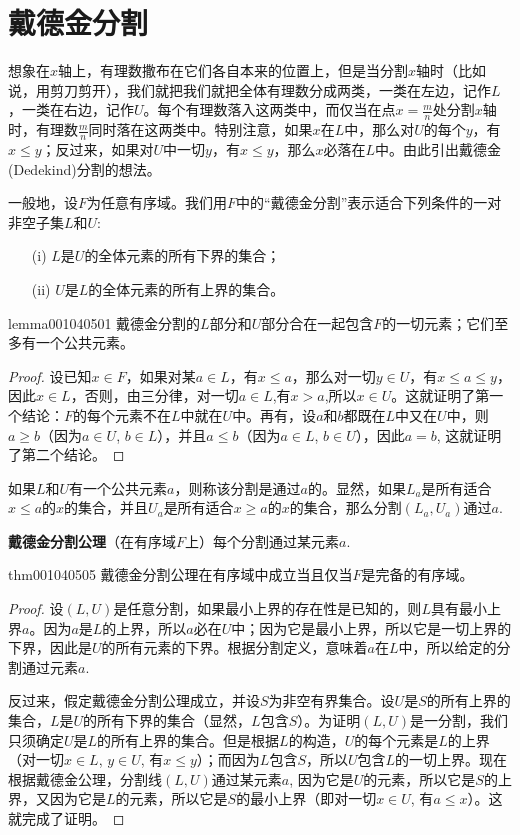 \section{戴德金分割}\label{section0010405}
想象在$x$轴上，有理数撒布在它们各自本来的位置上，但是当分割$x$轴时（比如说，用剪刀剪开），我们就把我们就把全体有理数分成两类，一类在左边，记作$L$，一类在右边，记作$U$。每个有理数落入这两类中，而仅当在点$x = \frac{m}{n}$处分割$x$轴时，有理数$\frac{m}{n}$同时落在这两类中。特别注意，如果$x$在$L$中，那么对$U$的每个$y$，有$x \le y$；反过来，如果对$U$中一切$y$，有$x \le y$，那么$x$必落在$L$中。由此引出戴德金(Dedekind)分割的想法。 

一般地，设$F$为任意有序域。我们用$F$中的“戴德金分割”表示适合下列条件的一对非空子集$L$和$U$:
\begin{enumerate}
\item[(i)]$L$是$U$的全体元素的所有下界的集合；
\item[(ii)]$U$是$L$的全体元素的所有上界的集合。
\end{enumerate}

\begin{lemma}{}{lemma001040501}
戴德金分割的$L$部分和$U$部分合在一起包含$F$的一切元素；它们至多有一个公共元素。
\end{lemma}

\begin{proof}
设已知$x \in F$，如果对某$a \in L$，有$x \le a$，那么对一切$y \in U$，有$x \le a \le y$，因此$x \in L$，否则，由三分律，对一切$a \in L$,有$x > a$,所以$x \in U$。这就证明了第一个结论：$F$的每个元素不在$L$中就在$U$中。再有，设$a$和$b$都既在$L$中又在$U$中，则$a \ge b$（因为$a \in U$, $b \in L$），并且$a \le b$（因为$a \in L$, $b \in U$），因此$a=b$, 这就证明了第二个结论。
\end{proof}

如果$L$和$U$有一个公共元素$a$，则称该分割是通过$a$的。显然，如果$L_a$是所有适合$x \le a$的$x$的集合，并且$U_a$是所有适合$x\ge a$的$x$的集合，那么分割$(L_a, U_a)$通过$a$.

\textbf{戴德金分割公理}\quad （在有序域$F$上）每个分割通过某元素$a$.

\begin{theorem}{}{thm001040505}
戴德金分割公理在有序域中成立当且仅当$F$是完备的有序域。
\end{theorem}

\begin{proof}
设$(L, U)$是任意分割，如果最小上界的存在性是已知的，则$L$具有最小上界$a$。因为$a$是$L$的上界，所以$a$必在$U$中；因为它是最小上界，所以它是一切上界的下界，因此是$U$的所有元素的下界。根据分割定义，意味着$a$在$L$中，所以给定的分割通过元素$a$.

反过来，假定戴德金分割公理成立，并设$S$为非空有界集合。设$U$是$S$的所有上界的集合，$L$是$U$的所有下界的集合（显然，$L$包含$S$）。为证明$(L,U)$是一分割，我们只须确定$U$是$L$的所有上界的集合。但是根据$L$的构造，$U$的每个元素是$L$的上界（对一切$x \in L$, $y \in U$, 有$x \le y$）；而因为$L$包含$S$，所以$U$包含$L$的一切上界。现在根据戴德金公理，分割线$(L,U)$通过某元素$a$, 因为它是$U$的元素，所以它是$S$的上界，又因为它是$L$的元素，所以它是$S$的最小上界（即对一切$x \in U$, 有$a \le x$）。这就完成了证明。
\end{proof}

